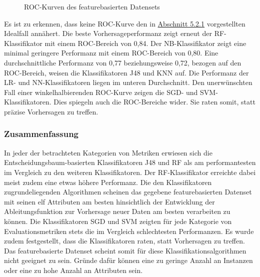 \begin{figure}[ht]
  \caption{ROC-Kurven des featurebasierten Datensets \label{fig:roc-feat}}
\end{figure}

Es ist zu erkennen, dass keine ROC-Kurve den in \hyperref[roc-def]{Abschnitt 5.2.1} vorgestellten Idealfall annähert. Die beste Vorhersageperformanz zeigt erneut der RF-Klassifikator mit einem ROC-Bereich von 0,84. Der NB-Klassifikator zeigt eine minimal geringere Performanz mit einem ROC-Bereich von 0,80. Eine durchschnittliche Performanz von 0,77 beziehungsweise 0,72, bezogen auf den ROC-Bereich, weisen die Klassifikatoren J48 und KNN auf. Die Performanz der LR- und NN-Klassifikatoren liegen im unteren Durchschnitt. Den unerwünschten Fall einer winkelhalbierenden ROC-Kurve zeigen die SGD- und SVM-Klassifikatoren. Dies spiegeln auch die ROC-Bereiche wider. Sie \glqq raten\grqq{} somit, statt präzise Vorhersagen zu treffen.

\subsubsection*{Zusammenfassung}
In jeder der betrachteten Kategorien von Metriken erwiesen sich die Entscheidungsbaum-basierten Klassifikatoren J48 und RF als am performantesten im Vergleich zu den weiteren Klassifikatoren. Der RF-Klassifikator erreichte dabei meist zudem eine etwas höhere Performanz. Die den Klassifikatoren zugrundeliegenden Algorithmen scheinen das gegebene featurebasierten Datenset mit seinen elf Attributen am besten hinsichtlich der Entwicklung der Ableitungsfunktion zur Vorhersage neuer Daten am besten verarbeiten zu können.
Die Klassifikatoren SGD und SVM zeigten für jede Kategorie von Evaluationsmetriken stets die im Vergleich schlechtesten Performanzen. Es wurde zudem festgestellt, dass die Klassifikatoren raten, statt Vorhersagen zu treffen. Das featurebasierte Datenset scheint somit für diese Klassifikationsalgorithmen nicht geeignet zu sein. Gründe dafür können eine zu geringe Anzahl an Instanzen oder eine zu hohe Anzahl an Attributen sein.

